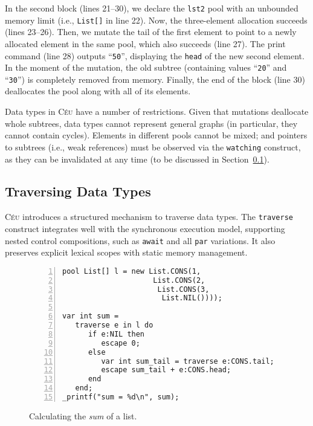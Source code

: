 \documentclass{acm_proc_article-sp}
\newcommand{\CEU}{\textsc{C\'{e}u}\xspace}
\newcommand{\code}[1] {{\small{\texttt{#1}}}}
\begin{document}
In the second block (lines 21--30), we declare the \code{lst2} pool with an
unbounded memory limit (i.e., \code{List[]} in line 22).
Now, the three-element allocation succeeds (lines 23--26).
Then, we mutate the tail of the first element to point to a newly allocated 
element in the same pool, which also succeeds (line 27).
The print command (line 28) outputs ``\texttt{50}'', displaying the \code{head}
of the new second element.
In the moment of the mutation, the old subtree (containing values  ``\texttt{20}''
and  ``\texttt{30}'') is completely removed from memory.
Finally, the end of the block (line 30) deallocates the pool along with all of 
its elements.


Data types in \CEU have a number of restrictions.
Given that mutations deallocate whole subtrees, data types cannot represent 
general graphs (in particular, they cannot contain cycles).
Elements in different pools cannot be mixed;
and pointers to subtrees (i.e., weak references) must be observed via the
\code{watching} construct, as they can be invalidated at any time
(to be discussed in Section~\ref{sec.traverse}).

\subsection{Traversing Data Types}
\label{sec.traverse}

\CEU introduces a structured mechanism to traverse data types.
The \code{traverse} construct integrates well with the synchronous execution 
model, supporting nested control compositions, such as \code{await} and all 
\code{par} variations.
It also preserves explicit lexical scopes with static memory management.

\begin{figure}%
\begin{lstlisting}[numbers=left,xleftmargin=3em]
pool List[] l = new List.CONS(1,
                     List.CONS(2,
                      List.CONS(3,
                       List.NIL())));

var int sum =
   traverse e in l do
      if e:NIL then
         escape 0;
      else
         var int sum_tail = traverse e:CONS.tail;
         escape sum_tail + e:CONS.head;
      end
   end;
_printf("sum = %d\n", sum);
\end{lstlisting}
\caption{
Calculating the \emph{sum} of a list.
\label{lst.sum}
}
\end{figure}
\end{document}
